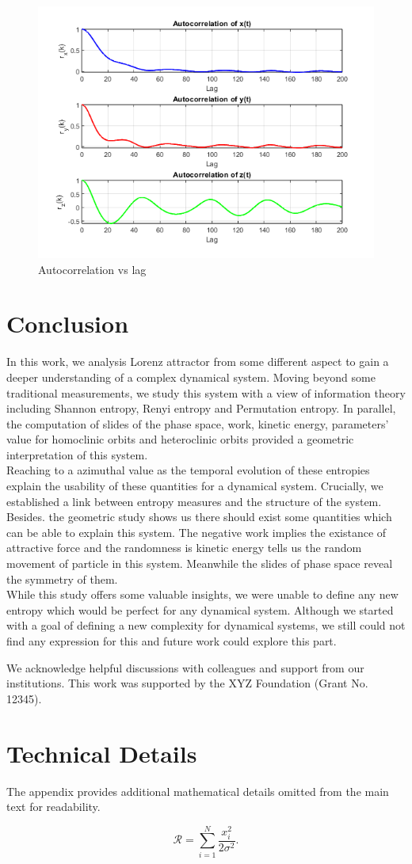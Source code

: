 \documentclass[%
reprint,
amsmath,amssymb,
aps,
floatfix,
]{revtex4-2}
\begin{document}
	\begin{figure}[htbp]
		\centering
		\includegraphics[width=0.8\linewidth]{auto_correlation.png}
		\caption{Autocorrelation vs lag}
		\label{fig:autocorrelation}
	\end{figure}
	\FloatBarrier
	\section{Conclusion}
	In this work, we analysis Lorenz attractor from some different aspect to gain a deeper understanding of a complex dynamical system. Moving beyond some traditional measurements, we study this system with a view of information theory including Shannon entropy, Renyi entropy and Permutation entropy. In parallel, the computation of slides of the phase space, work, kinetic energy, parameters' value for homoclinic orbits and heteroclinic orbits provided a geometric interpretation of this system.\\
	Reaching to a azimuthal value as the temporal evolution of these entropies explain the usability of these quantities for a dynamical system. Crucially, we established a link between entropy measures and the structure of the system. Besides. the geometric study shows us there should exist some quantities which can be able to explain this system. The negative work implies the existance of attractive force and the randomness is kinetic energy tells us the random movement of particle in this system. Meanwhile the slides of phase space reveal the symmetry of them.\\ 
	While this study offers some valuable insights, we were unable to define any new entropy which would be perfect for any dynamical system. Although we started with a goal of defining a new complexity for dynamical systems, we still could not find any expression for this and future work could explore this part. 
	\begin{acknowledgments}
		We acknowledge helpful discussions with colleagues and support from our institutions. This work was supported by the XYZ Foundation (Grant No. 12345).
	\end{acknowledgments}
	
	\appendix
	\section{Technical Details}
	
	The appendix provides additional mathematical details omitted from the main text for readability.
	
	\begin{equation}
		\mathcal{R} = \sum_{i=1}^N \frac{x_i^2}{2\sigma^2}.
		\label{eq:appendix_eq}
	\end{equation}
	
	
	
\end{document}
